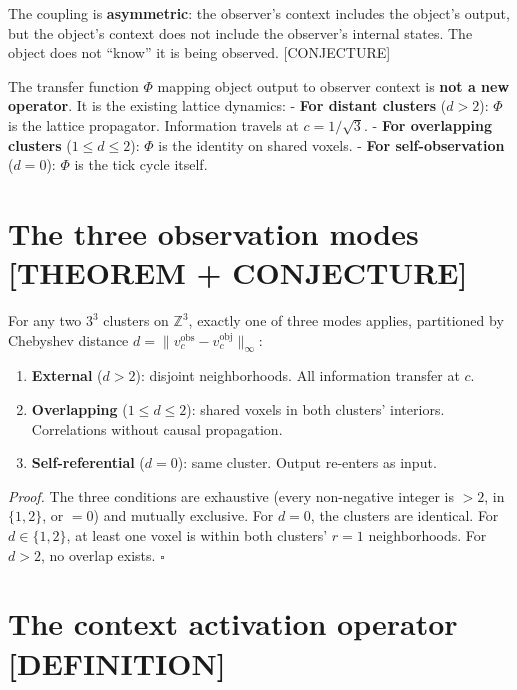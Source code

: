 \documentclass[
  11pt,
  letterpaper,
  twoside,
  openany]{book}
\makeatletter
\providecommand{\tightlist}{%
  \setlength{\itemsep}{0pt}\setlength{\parskip}{0pt}}
\let\orig@section\section
\renewcommand{\section}{\needspace{8\baselineskip}\orig@section}
\makeatother
\begin{document}
The coupling is \textbf{asymmetric}: the observer's context includes the
object's output, but the object's context does not include the
observer's internal states. The object does not ``know'' it is being
observed. {[}CONJECTURE{]}

The transfer function \(\Phi\) mapping object output to observer context
is \textbf{not a new operator}. It is the existing lattice dynamics: -
\textbf{For distant clusters} (\(d > 2\)): \(\Phi\) is the lattice
propagator. Information travels at \(c = 1/\sqrt{3}\). - \textbf{For
overlapping clusters} (\(1 \leq d \leq 2\)): \(\Phi\) is the identity on
shared voxels. - \textbf{For self-observation} (\(d = 0\)): \(\Phi\) is
the tick cycle itself.

\section{The three observation modes {[}THEOREM +
CONJECTURE{]}}\label{the-three-observation-modes-theorem-conjecture}

\begin{ftdtheorem}

For any two \(3^3\) clusters on \(\mathbb{Z}^3\), exactly one of three
modes applies, partitioned by Chebyshev distance
\(d = \|v_c^{\text{obs}} - v_c^{\text{obj}}\|_\infty\):

\begin{enumerate}
\def\labelenumi{\arabic{enumi}.}
\tightlist
\item
  \textbf{External} (\(d > 2\)): disjoint neighborhoods. All information
  transfer at \(c\).
\item
  \textbf{Overlapping} (\(1 \leq d \leq 2\)): shared voxels in both
  clusters' interiors. Correlations without causal propagation.
\item
  \textbf{Self-referential} (\(d = 0\)): same cluster. Output re-enters
  as input.
\end{enumerate}

\end{ftdtheorem}

\emph{Proof.} The three conditions are exhaustive (every non-negative
integer is \(> 2\), in \(\{1,2\}\), or \(= 0\)) and mutually exclusive.
For \(d = 0\), the clusters are identical. For \(d \in \{1,2\}\), at
least one voxel is within both clusters' \(r = 1\) neighborhoods. For
\(d > 2\), no overlap exists. \(\square\)

\section{The context activation operator
{[}DEFINITION{]}}\label{the-context-activation-operator-definition}
\end{document}
